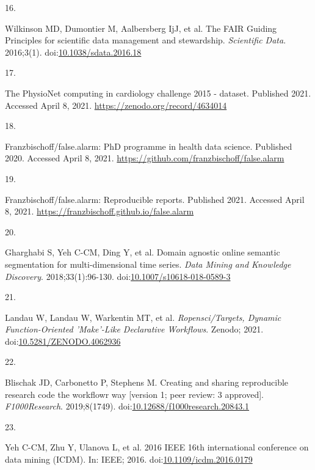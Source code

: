 \documentclass[12pt,twoside]{reedthesis}
\newlength{\csllabelwidth}
\newlength{\cslhangindent}
\newenvironment{CSLReferences}[2] %
 {%
  \setlength{\parindent}{0pt}
  \ifodd #1 \everypar{\setlength{\hangindent}{\cslhangindent}}\ignorespaces\fi
  \ifnum #2 > 0
  \setlength{\parskip}{#2\baselineskip}
  \fi
 }%
 {}
\newcommand{\CSLLeftMargin}[1]{\parbox[t]{\csllabelwidth}{#1}}
\newcommand{\CSLRightInline}[1]{\parbox[t]{\linewidth - \csllabelwidth}{#1}}
\begin{document}
\begin{CSLReferences}{0}{0}
\leavevmode{}%
\CSLLeftMargin{16. }
\CSLRightInline{Wilkinson MD, Dumontier M, Aalbersberg IjJ, et al. The FAIR Guiding Principles for scientific data management and stewardship. \emph{Scientific Data}. 2016;3(1). doi:\href{https://doi.org/10.1038/sdata.2016.18}{10.1038/sdata.2016.18}}

\leavevmode{}%
\CSLLeftMargin{17. }
\CSLRightInline{The PhysioNet computing in cardiology challenge 2015 - dataset. Published 2021. Accessed April 8, 2021. \url{https://zenodo.org/record/4634014}}

\leavevmode{}%
\CSLLeftMargin{18. }
\CSLRightInline{Franzbischoff/false.alarm: PhD programme in health data science. Published 2020. Accessed April 8, 2021. \url{https://github.com/franzbischoff/false.alarm}}

\leavevmode{}%
\CSLLeftMargin{19. }
\CSLRightInline{Franzbischoff/false.alarm: Reproducible reports. Published 2021. Accessed April 8, 2021. \url{https://franzbischoff.github.io/false.alarm}}

\leavevmode{}%
\CSLLeftMargin{20. }
\CSLRightInline{Gharghabi S, Yeh C-CM, Ding Y, et al. Domain agnostic online semantic segmentation for multi-dimensional time series. \emph{Data Mining and Knowledge Discovery}. 2018;33(1):96-130. doi:\href{https://doi.org/10.1007/s10618-018-0589-3}{10.1007/s10618-018-0589-3}}

\leavevmode{}%
\CSLLeftMargin{21. }
\CSLRightInline{Landau W, Landau W, Warkentin MT, et al. \emph{Ropensci/Targets, Dynamic Function-Oriented 'Make'-Like Declarative Workflows}. Zenodo; 2021. doi:\href{https://doi.org/10.5281/ZENODO.4062936}{10.5281/ZENODO.4062936}}

\leavevmode{}%
\CSLLeftMargin{22. }
\CSLRightInline{Blischak JD, Carbonetto P, Stephens M. Creating and sharing reproducible research code the workflowr way {[}version 1; peer review: 3 approved{]}. \emph{F1000Research}. 2019;8(1749). doi:\href{https://doi.org/10.12688/f1000research.20843.1}{10.12688/f1000research.20843.1}}

\leavevmode{}%
\CSLLeftMargin{23. }
\CSLRightInline{Yeh C-CM, Zhu Y, Ulanova L, et al. 2016 IEEE 16th international conference on data mining (ICDM). In: IEEE; 2016. doi:\href{https://doi.org/10.1109/icdm.2016.0179}{10.1109/icdm.2016.0179}}


\end{CSLReferences}
\end{document}
